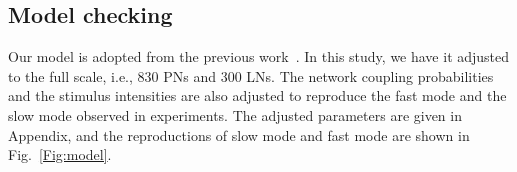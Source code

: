 \documentclass[12pt, a4paper]{article}
\begin{document}



\subsection{Model checking} \label{Sect:model_checking}

Our model is adopted from the previous work~\citep{Patel2009, Patel2013}. In this study, we have it adjusted to the full scale, i.e., 830 PNs and 300 LNs. The network coupling probabilities and the stimulus intensities are also adjusted to reproduce the fast mode and the slow mode observed in experiments. The adjusted parameters are given in Appendix, and the reproductions of slow mode and fast mode are shown in Fig.~\ref{Fig:model}.
\end{document}
